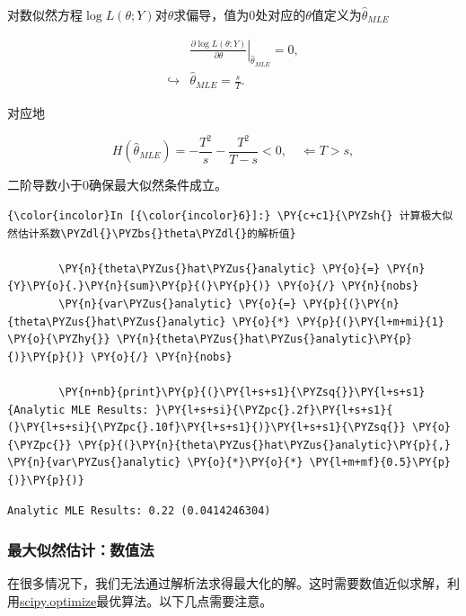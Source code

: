 对数似然方程\(\log L(\theta;Y)\)对\(\theta\)求偏导，值为\(0\)处对应的\(\theta\)值定义为\(\widehat{\theta}_{MLE}\)

\begin{equation}
\begin{split}
& \left. \frac{\partial \log L(\theta; Y)}{\partial \theta} \right|_{\widehat{\theta}_{MLE}} = 0, \\
\hookrightarrow & \widehat{\theta}_{MLE} = \frac{s}{T}.
\end{split}
\end{equation}

对应地

\begin{equation}
H \left( \widehat{\theta}_{MLE}\right) = - \frac{T^{2}}{s} - \frac{T^{2}}{T-s} <0, \quad \Leftarrow T > s,
\end{equation}

二阶导数小于\(0\)确保最大似然条件成立。

    \begin{Verbatim}[commandchars=\\\{\}]
{\color{incolor}In [{\color{incolor}6}]:} \PY{c+c1}{\PYZsh{} 计算极大似然估计系数\PYZdl{}\PYZbs{}theta\PYZdl{}的解析值}

        \PY{n}{theta\PYZus{}hat\PYZus{}analytic} \PY{o}{=} \PY{n}{Y}\PY{o}{.}\PY{n}{sum}\PY{p}{(}\PY{p}{)} \PY{o}{/} \PY{n}{nobs}
        \PY{n}{var\PYZus{}analytic} \PY{o}{=} \PY{p}{(}\PY{n}{theta\PYZus{}hat\PYZus{}analytic} \PY{o}{*} \PY{p}{(}\PY{l+m+mi}{1} \PY{o}{\PYZhy{}} \PY{n}{theta\PYZus{}hat\PYZus{}analytic}\PY{p}{)}\PY{p}{)} \PY{o}{/} \PY{n}{nobs}

        \PY{n+nb}{print}\PY{p}{(}\PY{l+s+s1}{\PYZsq{}}\PY{l+s+s1}{Analytic MLE Results: }\PY{l+s+si}{\PYZpc{}.2f}\PY{l+s+s1}{ (}\PY{l+s+si}{\PYZpc{}.10f}\PY{l+s+s1}{)}\PY{l+s+s1}{\PYZsq{}} \PY{o}{\PYZpc{}} \PY{p}{(}\PY{n}{theta\PYZus{}hat\PYZus{}analytic}\PY{p}{,} \PY{n}{var\PYZus{}analytic} \PY{o}{*}\PY{o}{*} \PY{l+m+mf}{0.5}\PY{p}{)}\PY{p}{)}
\end{Verbatim}

    \begin{Verbatim}[commandchars=\\\{\}]
Analytic MLE Results: 0.22 (0.0414246304)

    \end{Verbatim}

\subsubsection{最大似然估计：数值法}
\label{sec:ux6700ux5927ux4f3cux7136ux4f30ux8ba1ux6570ux503cux6cd5}
在很多情况下，我们无法通过解析法求得最大化的解。这时需要数值近似求解，利用\href{https://docs.scipy.org/doc/scipy/reference/optimize.html}{scipy.optimize}最优算法。以下几点需要注意。


